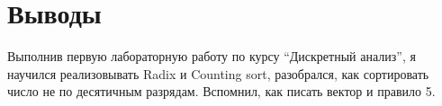 \section{Выводы}

Выполнив первую лабораторную работу по курсу \enquote{Дискретный анализ}, я научился реализовывать Radix и Counting sort, разобрался, как сортировать число не по десятичным разрядам. Вспомнил, как писать вектор и правило 5.
\pagebreak